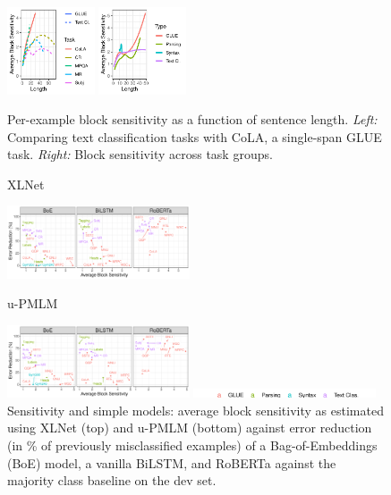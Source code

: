 \documentclass[11pt,a4paper]{article}
\begin{document}
\begin{figure}
    \centering
    \includegraphics[width=0.23\textwidth]{code/analyze/byLength_s1ensitivity_textclas_cola.pdf}
    \includegraphics[width=0.23\textwidth]{code/analyze/byLength_s1ensitivity_textclas_glue.pdf}
	\caption{Per-example block sensitivity as a function of sentence length. \textit{Left:} Comparing text classification tasks with CoLA, a single-span GLUE task. \textit{Right:} Block sensitivity across task groups.}
    \label{fig:sens-by-length}
\end{figure}


\begin{figure}
    \centering
	\footnotesize{XLNet}

    \includegraphics[width=0.48\textwidth]{code/analyze/s1ensitivity-accuracy-grid.pdf}

	\footnotesize{u-PMLM}

    \includegraphics[width=0.48\textwidth]{code/analyze/s1ensitivity-accuracy-grid-pmlm.pdf}

    \includegraphics[width=0.48\textwidth]{code/analyze/s1ensitivity-accuracy-grid-pmlm-legend.pdf}


	\caption{Sensitivity and simple models: average block sensitivity as estimated using XLNet (top) and u-PMLM (bottom) against error reduction (in \% of previously misclassified examples) of a Bag-of-Embeddings (BoE) model, a vanilla BiLSTM, and RoBERTa against the majority class baseline on the dev set.}
    \label{fig:sensitivity-cbow-acc}
\end{figure}
\end{document}
